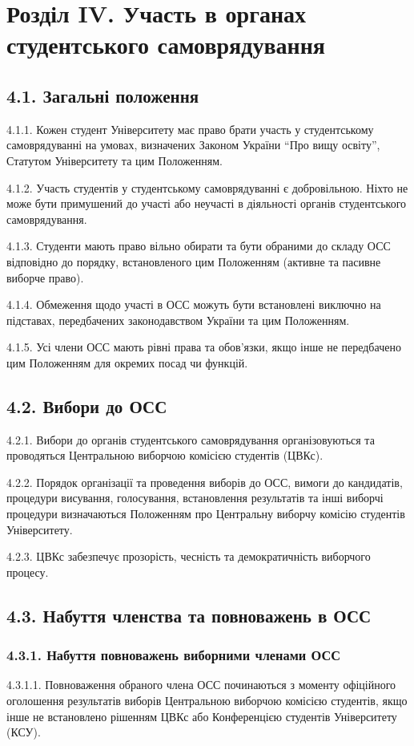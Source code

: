 \section*{Розділ IV. Участь в органах студентського самоврядування}

\subsection*{4.1. Загальні положення}
    4.1.1. Кожен студент Університету має право брати участь у студентському самоврядуванні на умовах, визначених Законом України ``Про вищу освіту'', Статутом Університету та цим Положенням.

    4.1.2. Участь студентів у студентському самоврядуванні є добровільною. Ніхто не може бути примушений до участі або неучасті в діяльності органів студентського самоврядування.

    4.1.3. Студенти мають право вільно обирати та бути обраними до складу ОСС відповідно до порядку, встановленого цим Положенням (активне та пасивне виборче право).

    4.1.4. Обмеження щодо участі в ОСС можуть бути встановлені виключно на підставах, передбачених законодавством України та цим Положенням.

    4.1.5. Усі члени ОСС мають рівні права та обов'язки, якщо інше не передбачено цим Положенням для окремих посад чи функцій.

\subsection*{4.2. Вибори до ОСС}
    4.2.1. Вибори до органів студентського самоврядування організовуються та проводяться Центральною виборчою комісією студентів (ЦВКс).

    4.2.2. Порядок організації та проведення виборів до ОСС, вимоги до кандидатів, процедури висування, голосування, встановлення результатів та інші виборчі процедури визначаються Положенням про Центральну виборчу комісію студентів Університету.

    4.2.3. ЦВКс забезпечує прозорість, чесність та демократичність виборчого процесу.

\subsection*{4.3. Набуття членства та повноважень в ОСС}
    \subsubsection*{4.3.1. Набуття повноважень виборними членами ОСС}
        4.3.1.1. Повноваження обраного члена ОСС починаються з моменту офіційного оголошення результатів виборів Центральною виборчою комісією студентів, якщо інше не встановлено рішенням ЦВКс або Конференцією студентів Університету (КСУ).

